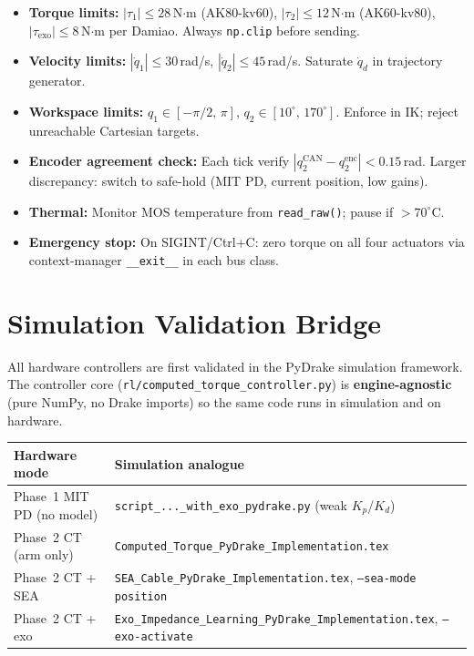 \documentclass[11pt,a4paper]{article}
\begin{document}
\begin{itemize}[leftmargin=2em]
  \item \textbf{Torque limits:}
        $|\tau_1|{\le}28$\,N$\cdot$m (AK80-kv60),
        $|\tau_2|{\le}12$\,N$\cdot$m (AK60-kv80),
        $|\tau_{\mathrm{exo}}|{\le}8$\,N$\cdot$m per Damiao.
        Always \texttt{np.clip} before sending.
  \item \textbf{Velocity limits:}
        $|\dot{q}_1|{\le}30$\,rad/s, $|\dot{q}_2|{\le}45$\,rad/s.
        Saturate $\dot{q}_d$ in trajectory generator.
  \item \textbf{Workspace limits:}
        $q_1{\in}[-\pi/2,\,\pi]$, $q_2{\in}[10^\circ,\,170^\circ]$.
        Enforce in IK; reject unreachable Cartesian targets.
  \item \textbf{Encoder agreement check:}
        Each tick verify $|q_2^{\mathrm{CAN}}{-}q_2^{\mathrm{enc}}|<0.15$\,rad.
        Larger discrepancy: switch to safe-hold (MIT PD, current position,
        low gains).
  \item \textbf{Thermal:}
        Monitor MOS temperature from \texttt{read\_raw()}; pause if $>70^\circ$C.
  \item \textbf{Emergency stop:}
        On SIGINT/Ctrl+C: zero torque on all four actuators via context-manager
        \texttt{\_\_exit\_\_} in each bus class.
\end{itemize}

\section{Simulation Validation Bridge}
\label{sec:sim}

All hardware controllers are first validated in the PyDrake simulation
framework.  The controller core (\texttt{rl/computed\_torque\_controller.py})
is \textbf{engine-agnostic} (pure NumPy, no Drake imports) so the same code
runs in simulation and on hardware.

\begin{center}\small
\begin{tabular}{ll}
\toprule
\textbf{Hardware mode} & \textbf{Simulation analogue} \\
\midrule
Phase~1 MIT PD (no model) &
  \texttt{script\_...\_with\_exo\_pydrake.py} (weak $K_p$/$K_d$) \\
Phase~2 CT (arm only) &
  \texttt{Computed\_Torque\_PyDrake\_Implementation.tex} \\
Phase~2 CT + SEA &
  \texttt{SEA\_Cable\_PyDrake\_Implementation.tex}, \texttt{--sea-mode position} \\
Phase~2 CT + exo &
  \texttt{Exo\_Impedance\_Learning\_PyDrake\_Implementation.tex},
  \texttt{--exo-activate} \\
\bottomrule
\end{tabular}
\end{center}
\end{document}

